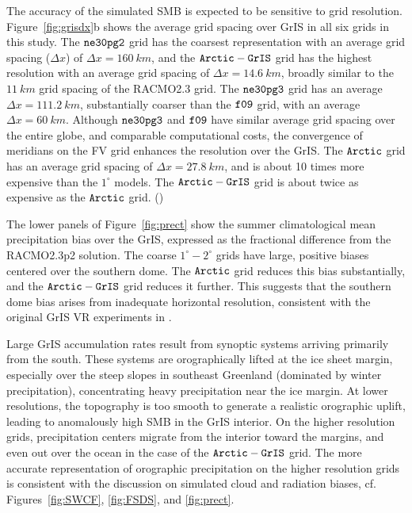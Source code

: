 \documentclass[draft]{agujournal2019}
\begin{document}
The accuracy of the simulated SMB is expected to be sensitive to grid resolution. Figure~\ref{fig:grisdx}b shows the average grid spacing over GrIS in all six grids in this study. The $\tt ne30pg2$ grid has the coarsest representation with an average grid spacing ($\Delta x$) of $\Delta x=160~km$, and the $\tt Arctic-GrIS$ grid has the highest resolution with an average grid spacing of $\Delta x=14.6~km$, broadly similar to the $11~km$ grid spacing of the RACMO2.3 grid. The $\tt ne30pg3$ grid has an average $\Delta x=111.2~km$, substantially coarser than the $\tt f09$ grid, with an average $\Delta x=60~km$. Although $\tt ne30pg3$ and $\tt f09$ have similar average grid spacing over the entire globe, and comparable computational costs, the convergence of meridians on the FV grid enhances the resolution over the GrIS. The $\tt Arctic$ grid has an average grid spacing of $\Delta x=27.8~km$, and is about 10 times more expensive than the $1^{\circ}$ models.  The $\tt Arctic-GrIS$ grid is about twice as expensive as the $\tt Arctic$ grid. ({\color{blue}{Wondering if this paragraph would go better in an earlier section. Rene agrees. Marcus agrees (move to 2.2)}})

The lower panels of Figure~\ref{fig:prect} show the summer climatological mean precipitation bias over the GrIS, expressed as the fractional difference from the RACMO2.3p2 solution. The coarse $1^{\circ}-2^{\circ}$ grids have large, positive biases centered over the southern dome. The $\tt Arctic$ grid reduces this bias substantially, and the $\tt Arctic-GrIS$ grid reduces it further. This suggests that the southern dome bias arises from inadequate horizontal resolution, consistent with the original GrIS VR experiments in . 

Large GrIS accumulation rates result from synoptic systems arriving primarily from the south. These systems are orographically lifted at the ice sheet margin, especially over the steep slopes in southeast Greenland (dominated by winter precipitation), concentrating heavy precipitation near the ice margin. At lower resolutions, the topography is too smooth to generate a realistic orographic uplift, leading to anomalously high SMB in the GrIS interior. On the higher resolution grids, precipitation centers migrate from the interior toward the margins, and even out over the ocean in the case of the $\tt Arctic-GrIS$ grid. The more accurate representation of orographic precipitation on the higher resolution grids is consistent with the discussion on simulated cloud and radiation biases, cf. Figures~\ref{fig:SWCF}, \ref{fig:FSDS}, and \ref{fig:prect}.
\end{document}

